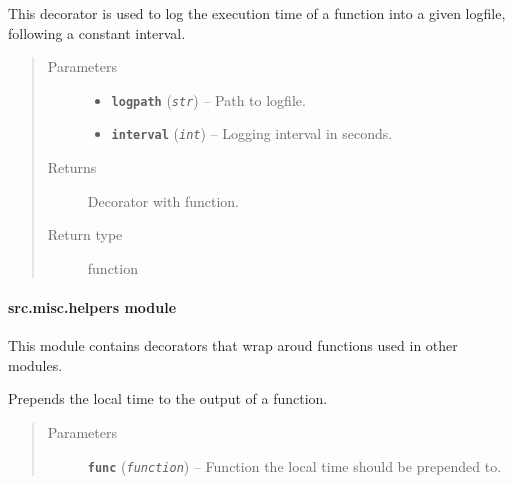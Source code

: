 \documentclass[letterpaper,10pt,english]{sphinxmanual}
\begin{document}
\begin{fulllineitems}
\label{src.misc:src.misc.decorators.log_time}
This decorator is used to log the execution time of a function into a given logfile, following a constant interval.
\begin{quote}\begin{description}
\item[{Parameters}] \leavevmode\begin{itemize}
\item {} 
\textbf{\texttt{logpath}} (\emph{\texttt{str}}) -- Path to logfile.

\item {} 
\textbf{\texttt{interval}} (\emph{\texttt{int}}) -- Logging interval in seconds.

\end{itemize}

\item[{Returns}] \leavevmode
Decorator with function.

\item[{Return type}] \leavevmode
function

\end{description}\end{quote}

\end{fulllineitems}



\paragraph{src.misc.helpers module}
\label{src.misc:src-misc-helpers-module}\label{src.misc:module-src.misc.helpers}
This module contains decorators that wrap aroud functions used in other modules.

\begin{fulllineitems}
\label{src.misc:src.misc.helpers.alt}
Prepends the local time to the output of a function.
\begin{quote}\begin{description}
\item[{Parameters}] \leavevmode
\textbf{\texttt{func}} (\emph{\texttt{function}}) -- Function the local time should be prepended to.

\end{description}\end{quote}

\end{fulllineitems}
\end{document}
